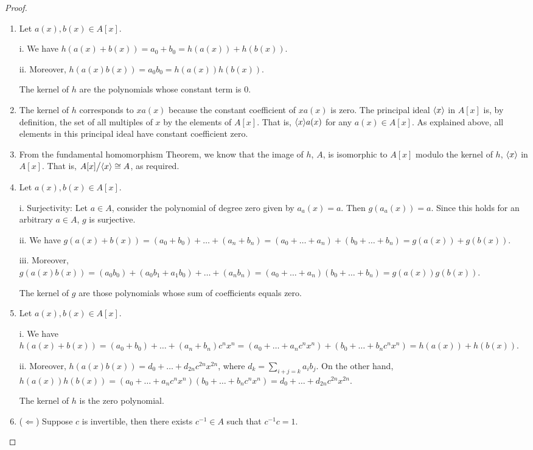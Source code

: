 \begin{proof}
\begin{enumerate}
    \item Let $a(x),b(x)\in A[x]$. 

    i. We have $h(a(x)+b(x))=a_0+b_0=h(a(x))+h(b(x))$.

    ii. Moreover, $h(a(x)b(x))=a_0b_0=h(a(x))h(b(x))$.

    The kernel of $h$ are the polynomials whose constant term is 0.
    \item The kernel of $h$ corresponds to $xa(x)$ because the constant coefficient of $xa(x)$ is zero. The principal ideal $\langle x\rangle$ in $A[x]$ is, by definition, the set of all multiples of $x$ by the elements of $A[x]$. That is, $\langle x\rangle a(x)$ for any $a(x)\in A[x]$. As explained above, all elements in this principal ideal have constant coefficient zero.
    \item From the fundamental homomorphism Theorem, we know that the image of $h$, $A$, is isomorphic to $A[x]$ modulo the kernel of $h$, $\langle x\rangle$ in $A[x]$. That is, ${\textstyle A[x]}\big/{\textstyle \langle x\rangle}\cong A$, as required.
    \item Let $a(x),b(x)\in A[x]$.

    i. Surjectivity: Let $a\in A$, consider the polynomial of degree zero given by $a_a(x)=a$. Then $g(a_a(x))=a$. Since this holds for an arbitrary $a\in A$, $g$ is surjective.

    ii. We have $g(a(x)+b(x))=(a_0+b_0)+\dots+(a_n+b_n)=(a_0+\dots+a_n)+(b_0+\dots+b_n)=g(a(x))+g(b(x))$.

    iii. Moreover, $g(a(x)b(x))=(a_0b_0)+(a_0b_1+a_1b_0)+\dots+(a_nb_n)=(a_0+\dots+a_n)(b_0+\dots+b_n)=g(a(x))g(b(x))$.

    The kernel of $g$ are those polynomials whose sum of coefficients equals zero.
    \item Let $a(x),b(x)\in A[x]$.

    i. We have $h(a(x)+b(x))=(a_0+b_0)+\dots+(a_n+b_n)c^nx^n= (a_0+\dots+a_nc^nx^n)+(b_0+\dots+b_nc^nx^n)= h(a(x))+h(b(x))$.

    ii. Moreover, $h(a(x)b(x))= d_0+\dots+d_{2n}c^{2n}x^{2n}$, where $d_k=\sum_{i+j=k}a_ib_j$. On the other hand, $h(a(x))h(b(x))= (a_0+\dots+a_nc^nx^n)(b_0+\dots+b_nc^nx^n)= d_0+\dots+d_{2n}c^{2n}x^{2n}$.

    The kernel of $h$ is the zero polynomial.
    \item ($\Leftarrow$) Suppose $c$ is invertible, then there exists $c^{-1}\in A$ such that $c^{-1}c=1$.
    

\end{enumerate}
\end{proof}
